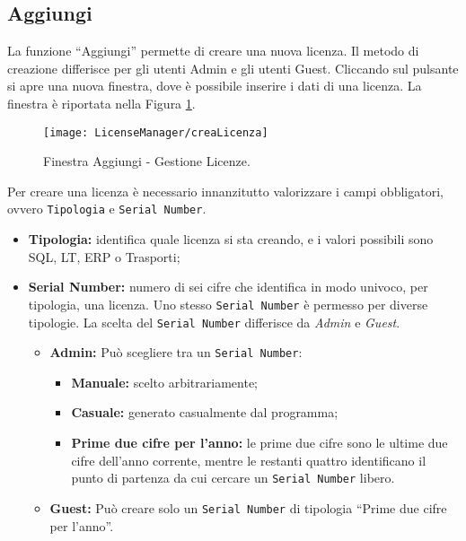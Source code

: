 \subsection{Aggiungi}
La funzione “Aggiungi” permette di creare una nuova licenza. Il metodo di creazione differisce per gli utenti Admin e gli utenti Guest. Cliccando sul pulsante si apre una nuova finestra, dove è possibile inserire i dati di una licenza. La finestra è riportata nella Figura \ref{crealic}.

\begin{figure}[!h] 
    \centering 
    \texttt{[image: LicenseManager/creaLicenza]} 
    \caption{Finestra Aggiungi - Gestione Licenze.}
    \label{crealic}
\end{figure}

Per creare una licenza è necessario innanzitutto valorizzare i campi obbligatori, ovvero \texttt{Tipologia} e \texttt{Serial Number}. 
\begin{itemize}

\item \textbf{Tipologia:} identifica quale licenza si sta creando, e i valori possibili sono SQL, LT, ERP o Trasporti; 
\item \textbf{Serial Number:} numero di sei cifre che identifica in modo univoco, per tipologia, una licenza. Uno stesso \texttt{Serial Number} è permesso per diverse tipologie. La scelta del \texttt{Serial Number} differisce da \textit{Admin} e \textit{Guest}.  
\begin{itemize}

\item	\textbf{Admin:} Può scegliere tra un \texttt{Serial Number}:
\begin{itemize}
\item \textbf{Manuale:} scelto arbitrariamente;
\item \textbf{Casuale:} generato casualmente dal programma;
\item \textbf{Prime due cifre per l'anno:} le prime due cifre sono le ultime due cifre dell'anno corrente, mentre le restanti quattro identificano il punto di partenza da cui cercare un \texttt{Serial Number} libero.
\end{itemize}
\item	\textbf{Guest:} Può creare solo un \texttt{Serial Number} di tipologia “Prime due cifre per l’anno”.
\end{itemize}

\end{itemize}	

